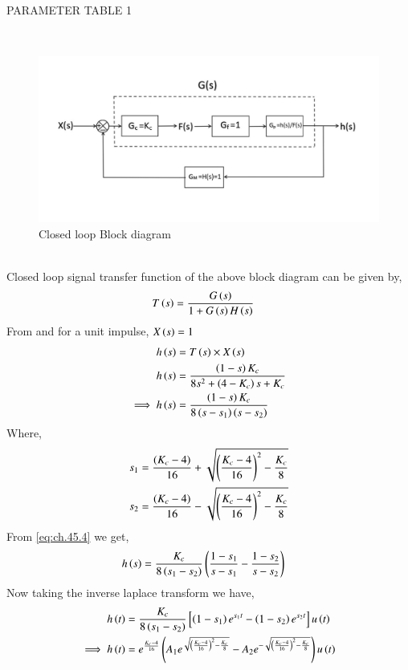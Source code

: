 \documentclass[journal,12pt,twocolumn]{IEEEtran}
\theoremstyle{remark}
\begin{document}
\begin{table}[ht]
    \centering
    
    \caption{PARAMETER TABLE 1}
    \label{tab:ch.45.1}
\end{table} \\
\begin{figure}[ht]
    \centering
    \includegraphics[width=\columnwidth]{2023/CH/45/figs/k.png}
    \caption{Closed loop Block diagram}
    \label{fig:ch.45.1}
\end{figure}    \\
Closed loop signal transfer function of the above block diagram can be given by,
\begin{align}
     T\left(s\right) &= \frac{G\left(s\right)}{1+G\left(s\right)H\left(s\right)}    
\end{align}
From  and 
for a unit impulse, $X\left(s\right)=1$ \\
\begin{align}
    h\left(s\right) &= T\left(s\right)\times X\left(s\right)   \\
    h\left(s\right) &= \frac{\left(1-s\right)K_c}{8s^2 + \left(4-K_c\right)s + K_c}  \\
    \implies h\left(s\right) &= \frac{\left(1-s\right)K_c}{8\left(s-s_1\right)\left(s-s_2\right)}  \label{eq:ch.45.4}
\end{align}
Where,
\begin{align}
    s_1 &= \frac{\left(K_c-4\right)}{16} + \sqrt{\left(\frac{K_c-4}{16}\right)^2 - \frac{K_c}{8}}  \\
    s_2 &= \frac{\left(K_c-4\right)}{16} - \sqrt{\left(\frac{K_c-4}{16}\right)^2 - \frac{K_c}{8}} 
\end{align}
From \eqref{eq:ch.45.4} we get,
\begin{align}
    h\left(s\right) &= \frac{K_c}{8\left(s_1-s_2\right)}\left(\frac{1-s_1}{s-s_1}-\frac{1-s_2}{s-s_2}\right)
\end{align}
Now taking the inverse laplace transform we have,
\begin{align}
    h\left(t\right) &= \frac{K_c}{8\left(s_1-s_2\right)} \left [\left(1-s_1\right)e^{s_1t}-\left(1-s_2\right)e^{s_2t} \right ]u\left(t\right)  \\
    \implies h\left(t\right) &= e^{\frac{K_c-4}{16}}\left(A_1e^{\sqrt{\left(\frac{K_c-4}{16}\right)^2 - \frac{K_c}{8}}} - A_2e^{-\sqrt{\left(\frac{K_c-4}{16}\right)^2 - \frac{K_c}{8}}}\right)u\left(t\right)    
\end{align}
\end{document}
